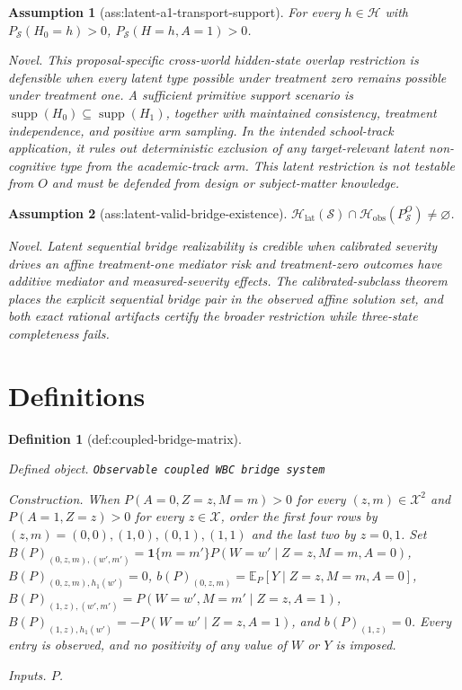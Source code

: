 \documentclass{article}
\newtheorem{assumption}{Assumption}
\newtheorem{definition}{Definition}
\begin{document}
\begin{assumption}[ass:latent-a1-transport-support]\label{ass:latent-a1-transport-support}
For every \(h\in\mathcal H\) with \(P_{\mathcal S}(H_0=h)>0\), \(P_{\mathcal S}(H=h,A=1)>0\).
\par\smallskip\noindent\emph{Novel.} This proposal-specific cross-world hidden-state overlap restriction is defensible when every latent type possible under treatment zero remains possible under treatment one. A sufficient primitive support scenario is \(\operatorname{supp}(H_0)\subseteq\operatorname{supp}(H_1)\), together with maintained consistency, treatment independence, and positive arm sampling. In the intended school-track application, it rules out deterministic exclusion of any target-relevant latent non-cognitive type from the academic-track arm. This latent restriction is not testable from \(O\) and must be defended from design or subject-matter knowledge.
\end{assumption}

\begin{assumption}[ass:latent-valid-bridge-existence]\label{ass:latent-valid-bridge-existence}
\(\mathcal H_{\mathrm{lat}}(\mathcal S)\cap\mathcal H_{\mathrm{obs}}(P_{\mathcal S}^O)\neq\varnothing\).
\par\smallskip\noindent\emph{Novel.} Latent sequential bridge realizability is credible when calibrated severity drives an affine treatment-one mediator risk and treatment-zero outcomes have additive mediator and measured-severity effects. The calibrated-subclass theorem places the explicit sequential bridge pair in the observed affine solution set, and both exact rational artifacts certify the broader restriction while three-state completeness fails.
\end{assumption}

\section{Definitions}

\begin{definition}[def:coupled-bridge-matrix]\label{def:coupled-bridge-matrix}
\par\smallskip\noindent\emph{Defined object.} \texttt{Observable coupled WBC bridge system}
\par\smallskip\noindent\emph{Construction.} When \(P(A=0,Z=z,M=m)>0\) for every \((z,m)\in\mathcal X^2\) and \(P(A=1,Z=z)>0\) for every \(z\in\mathcal X\), order the first four rows by \((z,m)=(0,0),(1,0),(0,1),(1,1)\) and the last two by \(z=0,1\). Set \(B(P)_{(0,z,m),(w',m')}=\mathbf 1\{m=m'\}P(W=w'\mid Z=z,M=m,A=0)\), \(B(P)_{(0,z,m),h_1(w')}=0\), \(b(P)_{(0,z,m)}=\mathbb E_P[Y\mid Z=z,M=m,A=0]\), \(B(P)_{(1,z),(w',m')}=P(W=w',M=m'\mid Z=z,A=1)\), \(B(P)_{(1,z),h_1(w')}=-P(W=w'\mid Z=z,A=1)\), and \(b(P)_{(1,z)}=0\). Every entry is observed, and no positivity of any value of \(W\) or \(Y\) is imposed.
\par\smallskip\noindent\emph{Inputs.} \(P\).
\end{definition}
\end{document}
